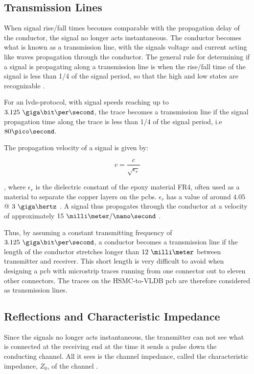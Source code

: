 \documentclass[main.tex]{subfiles}
\begin{document}
\subsection{Transmission Lines}

When signal rise/fall times becomes comparable with the propagation delay of the conductor, the signal no longer acts instantaneous. The conductor becomes what is known as a transmission line, with the signals voltage and current acting like waves propagation through the conductor. 
The general rule for determining if a signal is propagating along a transmission line is when the rise/fall time of the signal is less than 1/4 of the signal period, so that the high and low states are recognizable \cite{weste11}.

For an \gls{lvds}-protocol, with signal speeds reaching up to $3.125\ \giga\bit\per\second$, the trace becomes a transmission line if the signal propagation time along the trace is less than 1/4 of the signal period, i.e $80\pico\second$. 

The propagation velocity of a signal is given by:

\begin{equation}
    v = \frac{c}{\sqrt{\epsilon_r}}
\end{equation}

, where $\epsilon_r$ is the dielectric constant of the epoxy material FR4, often used as a material to separate the copper layers on the \glspl{pcb}. $\epsilon_r$ has a value of around $4.05$ @ $3\ \giga\hertz$ \cite{polar15}.
A signal thus propagates through the conductor at a velocity of approximately $15\ \milli\meter/\nano\second$ \cite[example 13.7]{weste11}.

Thus, by assuming a constant transmitting frequency of $3.125\ \giga\bit\per\second$, a conductor becomes a transmission line if the length of the conductor stretches longer than $12\ \milli\meter$ between transmitter and receiver. This short length is very difficult to avoid when designing a \gls{pcb} with microstrip traces running from one connector out to eleven other connectors. The traces on the HSMC-to-VLDB \gls{pcb} are therefore considered as transmission lines. 

\subsection{Reflections and Characteristic Impedance}

Since the signals no longer acts instantaneous, the transmitter can not see what is connected at the receiving end at the time it sends a pulse down the conducting channel. All it sees is the channel impedance, called the characteristic impedance, $Z_0$, of the channel \cite{weste11}.
\end{document}

